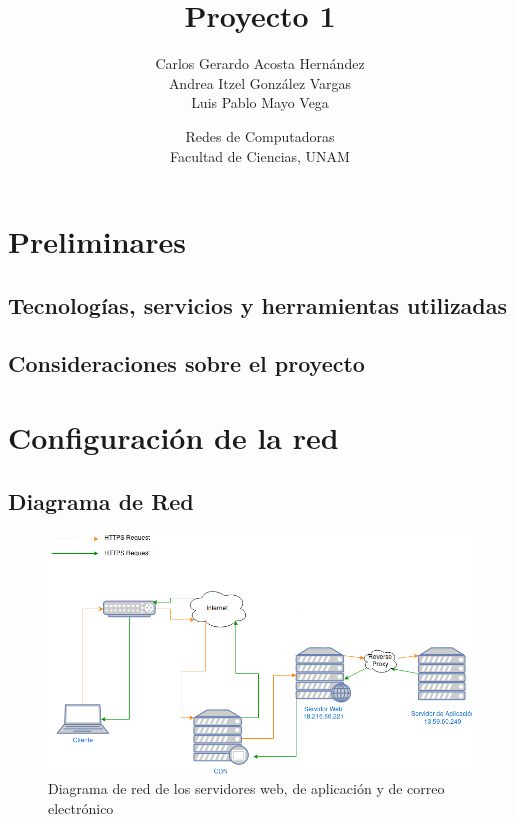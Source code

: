 \documentclass[12pt]{article}
\title{Proyecto 1}
\author{Carlos Gerardo Acosta Hernández \\ Andrea Itzel González Vargas \\ Luis Pablo Mayo Vega}
\date{Redes de Computadoras\\Facultad de Ciencias, UNAM}
\begin{document}
\maketitle

\tableofcontents

\newpage
\section{Preliminares}
\subsection{Tecnologías, servicios y herramientas utilizadas}
\subsection{Consideraciones sobre el proyecto}

\section{Configuración de la red}

\subsection{Diagrama de Red}
\begin{figure}[ht!]
  \centering
  \includegraphics[width=0.8\linewidth]{net_diagram}
  \caption{Diagrama de red de los servidores web, de aplicación y de correo electrónico}
\end{figure}
\end{document}
